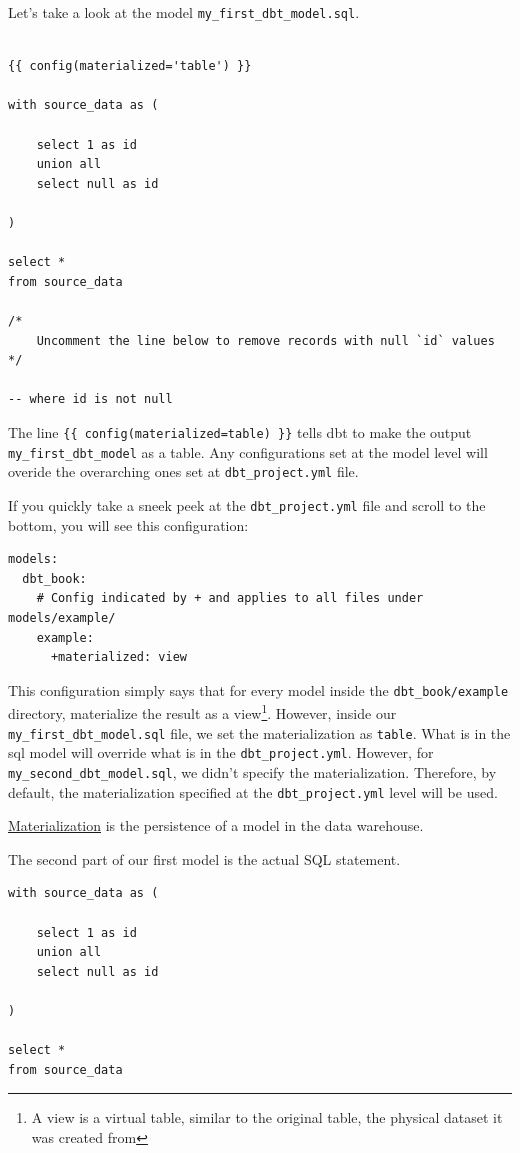 \documentclass[
]{book}
\begin{document}
Let's take a look at the model \texttt{my\_first\_dbt\_model.sql}.

\begin{verbatim}

{{ config(materialized='table') }}

with source_data as (

    select 1 as id
    union all
    select null as id

)

select *
from source_data

/*
    Uncomment the line below to remove records with null `id` values
*/

-- where id is not null
\end{verbatim}

The line \texttt{\{\{\ config(materialized=\textquotesingle{}table\textquotesingle{})\ \}\}} tells dbt to make the output \texttt{my\_first\_dbt\_model} as a table. Any configurations set at the model level will overide the overarching ones set at \texttt{dbt\_project.yml} file.

If you quickly take a sneek peek at the \texttt{dbt\_project.yml} file and scroll to the bottom, you will see this configuration:

\begin{verbatim}
models:
  dbt_book:
    # Config indicated by + and applies to all files under models/example/
    example:
      +materialized: view
\end{verbatim}

This configuration simply says that for every model inside the \texttt{dbt\_book/example} directory, materialize the result as a view\footnote{A view is a virtual table, similar to the original table, the physical dataset it was created from}. However, inside our \texttt{my\_first\_dbt\_model.sql} file, we set the materialization as \texttt{table}. What is in the sql model will override what is in the \texttt{dbt\_project.yml}. However, for \texttt{my\_second\_dbt\_model.sql}, we didn't specify the materialization. Therefore, by default, the materialization specified at the \texttt{dbt\_project.yml} level will be used.

\href{https://docs.getdbt.com/docs/build/materializations}{Materialization} is the persistence of a model in the data warehouse.

The second part of our first model is the actual SQL statement.

\begin{verbatim}
with source_data as (

    select 1 as id
    union all
    select null as id

)

select *
from source_data
\end{verbatim}
\end{document}
